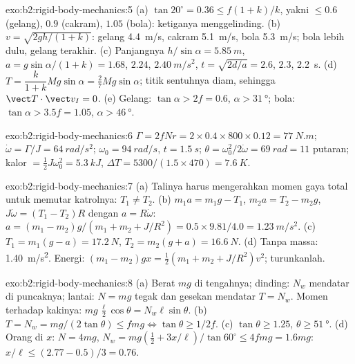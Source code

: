 \begin{solution}{exo:b2:rigid-body-mechanics:5}
(a) $\tan20^\circ = 0.36 \le f(1 + k)/k$, yakni $\le 0.6$ (gelang), $0.9$
(cakram), $1.05$ (bola): ketiganya menggelinding. (b) $v = \sqrt{2gh/(1 + k)}$:
gelang \qty{4.4}{m/s}, cakram \qty{5.1}{m/s}, bola \qty{5.3}{m/s}; bola
lebih dulu, gelang terakhir. (c) Panjangnya $h/\sin\alpha = \qty{5.85}{m}$, $a = g\sin\alpha/(1 + k) =
1.68$, $2.24$, $\qty{2.40}{m/s^2}$, $t = \sqrt{2d/a} = 2.6$, $2.3$, \qty{2.2}{s}.
(d) $T = \dfrac{k}{1 + k}Mg\sin\alpha = \tfrac27Mg\sin\alpha$; titik
sentuhnya diam, sehingga $\vect T\cdot\vect v_I = 0$. (e) Gelang: $\tan\alpha >
2f = 0.6$, $\alpha > \qty{31}{\degree}$; bola: $\tan\alpha > 3.5f = 1.05$,
$\alpha > \qty{46}{\degree}$.
\end{solution}

\begin{solution}{exo:b2:rigid-body-mechanics:6}
$\Gamma = 2fNr = 2 \times 0.4 \times 800 \times 0.12 = \qty{77}{N.m}$; $\dot\omega =
\Gamma/J = \qty{64}{rad/s^2}$; $\omega_0 = \qty{94}{rad/s}$, $t = \qty{1.5}{s}$;
$\theta = \omega_0^2/2\dot\omega = \qty{69}{rad} = 11$ putaran; kalor $= \tfrac12J
\omega_0^2 = \qty{5.3}{kJ}$, $\Delta T = 5300/(1.5 \times 470) = \qty{7.6}{K}$.
\end{solution}

\begin{solution}{exo:b2:rigid-body-mechanics:7}
(a) Talinya harus mengerahkan momen gaya total untuk memutar katrolnya: $T_1 \ne T_2$.
(b) $m_1a = m_1g - T_1$, $m_2a = T_2 - m_2g$, $J\dot\omega = (T_1 - T_2)R$ dengan
$a = R\dot\omega$: $a = (m_1 - m_2)g/(m_1 + m_2 + J/R^2) = 0.5 \times 9.81/4.0 =
\qty{1.23}{m/s^2}$. (c) $T_1 = m_1(g - a) = \qty{17.2}{N}$, $T_2 = m_2(g + a) =
\qty{16.6}{N}$. (d) Tanpa massa: \qty{1.40}{m/s^2}. Energi: $(m_1 - m_2)gx =
\tfrac12(m_1 + m_2 + J/R^2)v^2$; turunkanlah.
\end{solution}

\begin{solution}{exo:b2:rigid-body-mechanics:8}
(a) Berat $mg$ di tengahnya; dinding: $N_w$ mendatar di puncaknya; lantai:
$N = mg$ tegak dan gesekan mendatar $T = N_w$. Momen terhadap kakinya:
$mg\,\tfrac{\ell}2\cos\theta = N_w\ell\sin\theta$. (b) $T = N_w =
mg/(2\tan\theta) \le fmg \iff \tan\theta \ge 1/2f$. (c) $\tan\theta \ge
1.25$, $\theta \ge \qty{51}{\degree}$. (d) Orang di $x$: $N = 4mg$, $N_w =
mg(\tfrac12 + 3x/\ell)/\tan60^\circ \le 4fmg = 1.6mg$: $x/\ell \le (2.77 -
0.5)/3 = 0.76$.
\end{solution}

